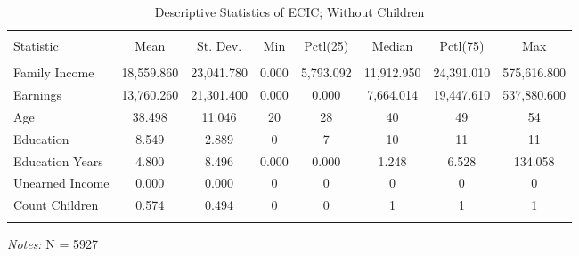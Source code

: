 \documentclass[a4paper]{article}
\begin{document}
\begin{table}[!htbp] 
\begin{adjustwidth}{-0cm}{-0cm}
\begin{threeparttable}
\small
\captionsetup{font=small, justification=raggedright,singlelinecheck=false}
  \caption{Descriptive Statistics of ECIC; Without Children} 
  \label{} 
\begin{tabular}{@{\extracolsep{5pt}}lccccccc} 
\\[-1.8ex]\hline 
\hline \\[-1.8ex] 
Statistic & \multicolumn{1}{c}{Mean} & \multicolumn{1}{c}{St. Dev.} & \multicolumn{1}{c}{Min} & \multicolumn{1}{c}{Pctl(25)} & \multicolumn{1}{c}{Median} & \multicolumn{1}{c}{Pctl(75)} & \multicolumn{1}{c}{Max} \\ 
\hline \\[-1.8ex] 
Family Income & 18,559.860 & 23,041.780 & 0.000 & 5,793.092 & 11,912.950 & 24,391.010 & 575,616.800 \\ 
Earnings & 13,760.260 & 21,301.400 & 0.000 & 0.000 & 7,664.014 & 19,447.610 & 537,880.600 \\ 
Age & 38.498 & 11.046 & 20 & 28 & 40 & 49 & 54 \\ 
Education & 8.549 & 2.889 & 0 & 7 & 10 & 11 & 11 \\ 
Education Years & 4.800 & 8.496 & 0.000 & 0.000 & 1.248 & 6.528 & 134.058 \\ 
Unearned Income & 0.000 & 0.000 & 0 & 0 & 0 & 0 & 0 \\ 
Count Children & 0.574 & 0.494 & 0 & 0 & 1 & 1 & 1 \\ 
\hline \\[-1.8ex] 
\end{tabular} 
\begin{tablenotes}
      \small
      \item\textit{Notes:} N = 5927
    \end{tablenotes}
\end{threeparttable}
\end{adjustwidth}
\end{table}
\end{document}
